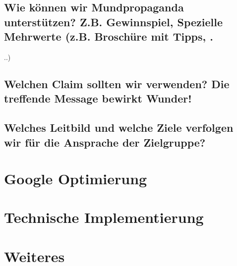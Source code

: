 \documentclass[11pt]{scrreprt}
\begin{document}
\section{Wie können wir Mundpropaganda
unterstützen?
Z.B. Gewinnspiel, Spezielle Mehrwerte (z.B.
Broschüre mit Tipps, .}..)

\section{Welchen Claim sollten wir verwenden?
Die treffende Message bewirkt Wunder!}

\section{Welches Leitbild und welche Ziele verfolgen wir
für die Ansprache der Zielgruppe?}

\chapter{Google Optimierung}
\chapter{Technische Implementierung}
\chapter{Weiteres}
\end{document}
